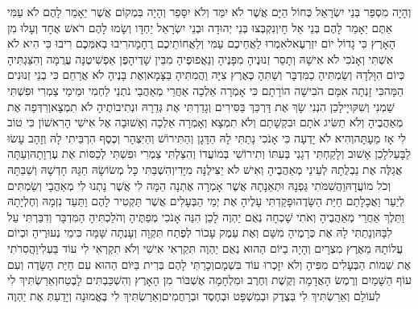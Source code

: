 \documentclass[../main/main.tex]{subfiles}
\begin{document}
\begin{multicols*}{\ncols}
וְהָיָה מִסְפַּר בְּנֵי יִשְׂרָאֵל כְּחוֹל הַיָּם אֲשֶׁר לֹא יִמַּד וְלֹא יִסָּפֵר וְהָיָה בִּמְקוֹם אֲשֶׁר יֵאָמֵר לָהֶם לֹא עַמִּי אַתֶּם יֵאָמֵר לָהֶם בְּנֵי אֵל חָי\PreVerseSpace{}וְנִקְבְּצוּ בְּנֵי יְהוּדָה וּבְנֵי יִשְׂרָאֵל יַחְדָּו וְשָׂמוּ לָהֶם רֹאשׁ אֶחָד וְעָלוּ מִן הָאָרֶץ כִּי גָדוֹל יוֹם יִזְרְעֶאל\PreVerseSpace{}אִמְרוּ לַאֲחֵיכֶם עַמִּי וְלַאֲחוֹתֵיכֶם רֻחָמָה\PreVerseSpace{}רִיבוּ בְאִמְּכֶם רִיבוּ כִּי הִיא לֹא אִשְׁתִּי וְאָנֹכִי לֹא אִישָׁהּ וְתָסֵר זְנוּנֶיהָ מִפָּנֶיהָ וְנַאֲפוּפֶיהָ מִבֵּין שָׁדֶיהָ\PreVerseSpace{}פֶּן אַפְשִׁיטֶנָּה עֲרֻמָּה וְהִצַּגְתִּיהָ כְּיוֹם הִוָּלְדָהּ וְשַׂמְתִּיהָ כַמִּדְבָּר וְשַׁתִּהָ כְּאֶרֶץ צִיָּה וַהֲמִתִּיהָ בַּצָּמָא\PreVerseSpace{}וְאֶת בָּנֶיהָ לֹא אֲרַחֵם כִּי בְנֵי זְנוּנִים הֵמָּה\PreVerseSpace{}כִּי זָנְתָה אִמָּם הֹבִישָׁה הוֹרָתָם כִּי אָמְרָה אֵלְכָה אַחֲרֵי מְאַהֲבַי נֹתְנֵי לַחְמִי וּמֵימַי צַמְרִי וּפִשְׁתִּי שַׁמְנִי וְשִׁקּוּיָי\PreVerseSpace{}לָכֵן הִנְנִי שָׂךְ אֶת דַּרְכֵּךְ בַּסִּירִים וְגָדַרְתִּי אֶת גְּדֵרָהּ וּנְתִיבוֹתֶיהָ לֹא תִמְצָא\PreVerseSpace{}וְרִדְּפָה אֶת מְאַהֲבֶיהָ וְלֹא תַשִּׂיג אֹתָם וּבִקְשָׁתַם וְלֹא תִמְצָא וְאָמְרָה אֵלְכָה וְאָשׁוּבָה אֶל אִישִׁי הָרִאשׁוֹן כִּי טוֹב לִי אָז מֵעָתָּה\PreVerseSpace{}וְהִיא לֹא יָדְעָה כִּי אָנֹכִי נָתַתִּי לָהּ הַדָּגָן וְהַתִּירוֹשׁ וְהַיִּצְהָר וְכֶסֶף הִרְבֵּיתִי לָהּ וְזָהָב עָשׂוּ לַבָּעַל\PreVerseSpace{}לָכֵן אָשׁוּב וְלָקַחְתִּי דְגָנִי בְּעִתּוֹ וְתִירוֹשִׁי בְּמוֹעֲדוֹ וְהִצַּלְתִּי צַמְרִי וּפִשְׁתִּי לְכַסּוֹת אֶת עֶרְוָתָהּ\PreVerseSpace{}וְעַתָּה אֲגַלֶּה אֶת נַבְלֻתָהּ לְעֵינֵי מְאַהֲבֶיהָ וְאִישׁ לֹא יַצִּילֶנָּה מִיָּדִי\PreVerseSpace{}וְהִשְׁבַּתִּי כָּל מְשׂוֹשָׂהּ חַגָּהּ חָדְשָׁהּ וְשַׁבַּתָּהּ וְכֹל מוֹעֲדָהּ\PreVerseSpace{}וַהֲשִׁמֹּתִי גַּפְנָהּ וּתְאֵנָתָהּ אֲשֶׁר אָמְרָה אֶתְנָה הֵמָּה לִי אֲשֶׁר נָתְנוּ לִי מְאַהֲבָי וְשַׂמְתִּים לְיַעַר וַאֲכָלָתַם חַיַּת הַשָּׂדֶה\PreVerseSpace{}וּפָקַדְתִּי עָלֶיהָ אֶת יְמֵי הַבְּעָלִים אֲשֶׁר תַּקְטִיר לָהֶם וַתַּעַד נִזְמָהּ וְחֶלְיָתָהּ וַתֵּלֶךְ אַחֲרֵי מְאַהֲבֶיהָ וְאֹתִי שָׁכְחָה נְאֻם יַהְוֶה \ClosedSection{}לָכֵן הִנֵּה אָנֹכִי מְפַתֶּיהָ וְהֹלַכְתִּיהָ הַמִּדְבָּר וְדִבַּרְתִּי עַל לִבָּהּ\PreVerseSpace{}וְנָתַתִּי לָהּ אֶת כְּרָמֶיהָ מִשָּׁם וְאֶת עֵמֶק עָכוֹר לְפֶתַח תִּקְוָה וְעָנְתָה שָּׁמָּה כִּימֵי נְעוּרֶיהָ וּכְיוֹם עֲלוֹתָהּ מֵאֶרֶץ מִצְרָיִם \ClosedSection{}וְהָיָה בַיּוֹם הַהוּא נְאֻם יַהְוֶה תִּקְרְאִי אִישִׁי וְלֹא תִקְרְאִי לִי עוֹד בַּעְלִי\PreVerseSpace{}וַהֲסִרֹתִי אֶת שְׁמוֹת הַבְּעָלִים מִפִּיהָ וְלֹא יִזָּכְרוּ עוֹד בִּשְׁמָם\PreVerseSpace{}וְכָרַתִּי לָהֶם בְּרִית בַּיּוֹם הַהוּא עִם חַיַּת הַשָּׂדֶה וְעִם עוֹף הַשָּׁמַיִם וְרֶמֶשׂ הָאֲדָמָה וְקֶשֶׁת וְחֶרֶב וּמִלְחָמָה אֶשְׁבּוֹר מִן הָאָרֶץ וְהִשְׁכַּבְתִּים לָבֶטַח\PreVerseSpace{}וְאֵרַשְׂתִּיךְ לִי לְעוֹלָם וְאֵרַשְׂתִּיךְ לִי בְּצֶדֶק וּבְמִשְׁפָּט וּבְחֶסֶד וּבְרַחֲמִים\PreVerseSpace{}וְאֵרַשְׂתִּיךְ לִי בֶּאֱמוּנָה וְיָדַעַתְּ אֶת יַהְוֶה\OpenSection{}\par

\end{multicols*}
\end{document}
